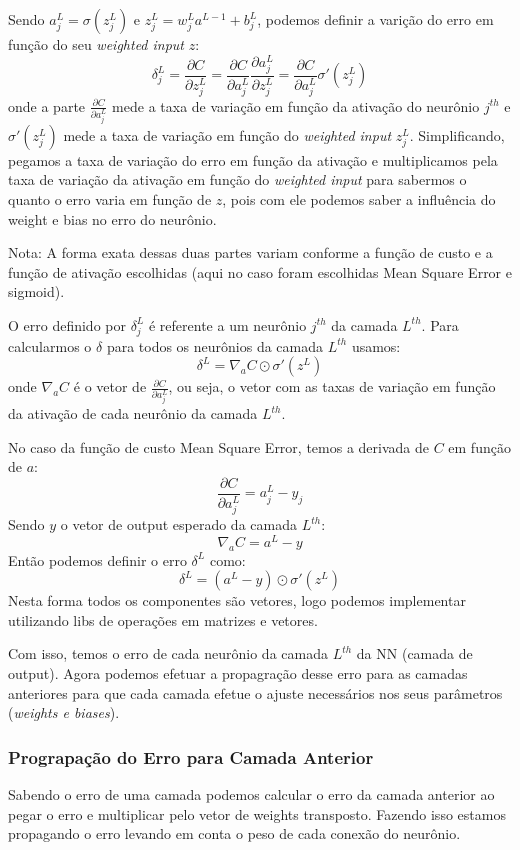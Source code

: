 \documentclass[11pt,a4paper,leqno]{article}
\begin{document}
Sendo $a^L_j = \sigma(z^L_j)$ e $z^L_j = w^L_j a^{L-1} + b^L_j$, podemos definir a varição do erro em função do seu \emph{weighted input} $z$:
\[
	\delta^L_j = \frac{\partial C}{\partial z^L_j}
	= \frac{\partial C}{\partial a^L_j} \frac{\partial a^L_j}{\partial z^L_j}
	= \frac{\partial C}{\partial a^L_j} \sigma'(z^L_j)
\]
onde a parte $\frac{\partial C}{\partial a^L_j}$ mede a taxa de variação em função da ativação do neurônio $j^{th}$ e $\sigma'(z^L_j)$ mede a taxa de variação em função do \emph{weighted input} $z^L_j$. Simplificando, pegamos a taxa de variação do erro em função da ativação e multiplicamos pela taxa de variação da ativação em função do \emph{weighted input} para sabermos o quanto o erro varia em função de $z$, pois com ele podemos saber a influência do weight e bias no erro do neurônio.

Nota: A forma exata dessas duas partes variam conforme a função de custo e a função de ativação escolhidas (aqui no caso foram escolhidas Mean Square Error e sigmoid).

O erro definido por $\delta^L_j$ é referente a um neurônio $j^{th}$ da camada $L^{th}$. Para calcularmos o $\delta$ para todos os neurônios da camada $L^{th}$ usamos:
\[
	\delta^L = \nabla_a C \odot \sigma'(z^L)
\]
onde $\nabla_a C$ é o vetor de $\frac{\partial C}{\partial a^L_j}$, ou seja, o vetor com as taxas de variação em função da ativação de cada neurônio da camada $L^{th}$.

No caso da função de custo Mean Square Error, temos a derivada de $C$ em função de $a$:
\[
	\frac{\partial C}{\partial a^L_j} = a^L_j - y_j
\]
Sendo $y$ o vetor de output esperado da camada $L^{th}$:
\[
	\nabla_a C = a^L - y
\]
Então podemos definir o erro $\delta^L$ como:
\[
	\delta^L = (a^L - y) \odot \sigma'(z^L)
\]
Nesta forma todos os componentes são vetores, logo podemos implementar utilizando libs de operações em matrizes e vetores.

Com isso, temos o erro de cada neurônio da camada $L^{th}$ da NN (camada de output). Agora podemos efetuar a propagração desse erro para as camadas anteriores para que cada camada efetue o ajuste necessários nos seus parâmetros (\emph{weights e biases}).

\subsubsection{Prograpação do Erro para Camada Anterior}
Sabendo o erro de uma camada podemos calcular o erro da camada anterior ao pegar o erro e multiplicar pelo vetor de weights transposto. Fazendo isso estamos propagando o erro levando em conta o peso de cada conexão do neurônio.
\end{document}
